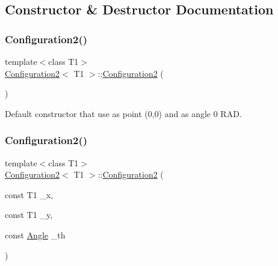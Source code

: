 \subsection{Constructor \& Destructor Documentation}
\mbox{\label{class_configuration2_a6fc5a5a723da700b6a869db09ec5614f}} 
\subsubsection{\texorpdfstring{Configuration2()}{Configuration2()}\hspace{0.1cm}{\footnotesize\ttfamily [1/4]}}
{\footnotesize\ttfamily template$<$class T1$>$ \\
\mbox{\hyperlink{class_configuration2}{Configuration2}}$<$ T1 $>$\+::\mbox{\hyperlink{class_configuration2}{Configuration2}} (\begin{DoxyParamCaption}{ }\end{DoxyParamCaption})\hspace{0.3cm}{\ttfamily [inline]}}



Default constructor that use as point (0,0) and as angle 0 R\+AD. 

\mbox{\label{class_configuration2_a09e73e9fe2ae9a67a037a0b3d0619047}} 
\subsubsection{\texorpdfstring{Configuration2()}{Configuration2()}\hspace{0.1cm}{\footnotesize\ttfamily [2/4]}}
{\footnotesize\ttfamily template$<$class T1$>$ \\
\mbox{\hyperlink{class_configuration2}{Configuration2}}$<$ T1 $>$\+::\mbox{\hyperlink{class_configuration2}{Configuration2}} (\begin{DoxyParamCaption}\item[{const T1}]{\+\_\+x,  }\item[{const T1}]{\+\_\+y,  }\item[{const \mbox{\hyperlink{class_angle}{Angle}}}]{\+\_\+th }\end{DoxyParamCaption})\hspace{0.3cm}{\ttfamily [inline]}}



